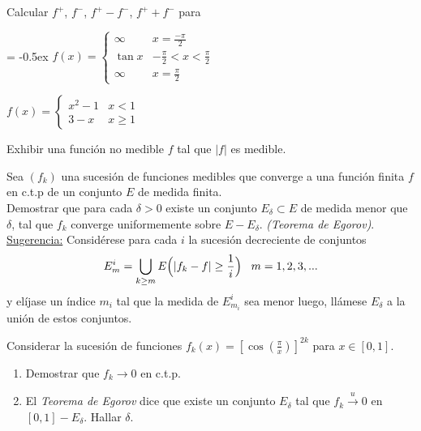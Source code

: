 \documentclass{book}
\begin{document}
\begin{ejer}{} 
Calcular $f^+$, $f^-$, $f^+-f^-$, $f^{+} + f^-$ para
\begin{enumerate}
\item 
{
\extrarowheight = -0.5ex
\renewcommand{\arraystretch}{1.5}
$f(x)=\left\{
\begin{array}{lc}
\infty&x=\frac{-\pi}{2}
\\
\tan x &-\frac{\pi}{2}<x<\frac{\pi}{2}
\\
\infty&x=\frac{\pi}{2}
\end{array}
\right.$
\item $f(x)=\left\{
\begin{array}{ll}
x^2-1&x<1
\\
3-x&x\geq 1
\end{array}
\right.$}
\end{enumerate}
\end{ejer}




\begin{ejer}{} 
Exhibir una función no medible $f$ tal que $|f|$ es medible.
\end{ejer}




\begin{ejer}{} 
Sea $(f_k)$ una sucesión de  funciones medibles que converge a una función finita $f$
en c.t.p de un conjunto $E$ de medida finita. 
\\
Demostrar que para cada $\delta>0$  existe un conjunto
$E_{\delta}\subset E$ de medida menor que $\delta$, tal que $f_k$ converge uniformemente sobre 
$E-E_{\delta}$. 
{\it{(Teorema de Egorov)}}.
\\
\underline{Sugerencia:} Considérese para cada $i$ la 
sucesión decreciente de conjuntos
$$E_m^i=\bigcup_{k\geq m}E\Bigl(|f_k-f|\geq \frac{1}{i}\Bigr) \;\;\;m=1,2,3,...$$
y elíjase un índice $m_i$ tal que la medida de $E_{m_i}^i$ sea menor luego, llámese $E_{\delta}$ a la unión de estos conjuntos.
\end{ejer} 

\begin{ejer}{} 
Considerar la sucesi\'on de funciones $f_k(x)=[\cos(\frac{\pi}{x})]^{2k}$ para $x \in [0,1]$.
\begin{enumerate}
\item Demostrar que $f_k \to 0$ en c.t.p.
\item El \textit{Teorema de Egorov} dice que existe un conjunto $E_{\delta}$ tal que $f_k \xrightarrow{u} 0$
en $[0,1]-E_{\delta}$. 
Hallar $\delta$.
\end{enumerate}
\end{ejer}
\end{document}
